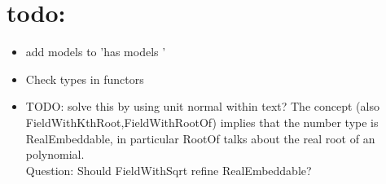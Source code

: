 


\section{todo:}
\begin{itemize} 
\item add models to 'has models '
\item Check types in functors 
\item TODO: solve this by using unit normal within text?
      The concept  (also FieldWithKthRoot,FieldWithRootOf) 
      implies that the number type is RealEmbeddable, in particular RootOf talks 
      about the real root of an polynomial.\\
      Question: Should FieldWithSqrt refine RealEmbeddable?
      
\end{itemize}

